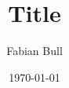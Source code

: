 \documentclass[a4paper,12pt]{article}
\title{Title}
\author{Fabian Bull}
\date{\today}
\begin{document}
\maketitle{}
\tableofcontents{}
\pagebreak{}


\FloatBarrier{}
\printbibliography{}
\end{document}
